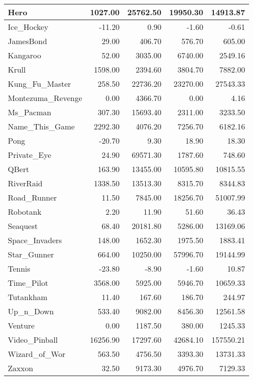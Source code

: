 \begin{table*}[h]
\begin{tabular}{l|r|r|r|r}
		\hline
		Hero & 1027.00 & 25762.50 & 19950.30 & 14913.87 \\
		\hline
		Ice\_Hockey & -11.20 & 0.90 & -1.60 & -0.61 \\
		\hline
		JamesBond & 29.00 & 406.70 & 576.70 & 605.00 \\
		\hline
		Kangaroo & 52.00 & 3035.00 & 6740.00 & 2549.16 \\
		\hline
		Krull & 1598.00 & 2394.60 & 3804.70 & 7882.00 \\
		\hline
		Kung\_Fu\_Master & 258.50 & 22736.20 & 23270.00 & 27543.33 \\
		\hline
		Montezuma\_Revenge & 0.00 & 4366.70 & 0.00 & 4.16 \\
		\hline
		Ms\_Pacman & 307.30 & 15693.40 & 2311.00 & 3233.50 \\
		\hline
		Name\_This\_Game & 2292.30 & 4076.20 & 7256.70 & 6182.16 \\
		\hline
		Pong & -20.70 & 9.30 & 18.90 & 18.30 \\
		\hline
		Private\_Eye & 24.90 & 69571.30 & 1787.60 & 748.60 \\
		\hline
		QBert & 163.90 & 13455.00 & 10595.80 & 10815.55 \\
		\hline
		RiverRaid & 1338.50 & 13513.30 & 8315.70 & 8344.83 \\
		\hline
		Road\_Runner & 11.50 & 7845.00 & 18256.70 & 51007.99 \\
		\hline
		Robotank & 2.20 & 11.90 & 51.60 & 36.43 \\
		\hline
		Seaquest & 68.40 & 20181.80 & 5286.00 & 13169.06 \\
		\hline
		Space\_Invaders & 148.00 & 1652.30 & 1975.50 & 1883.41 \\
		\hline
		Star\_Gunner & 664.00 & 10250.00 & 57996.70 & 19144.99 \\
		\hline
		Tennis & -23.80 & -8.90 & -1.60 & 10.87 \\
		\hline
		Time\_Pilot & 3568.00 & 5925.00 & 5946.70 & 10659.33 \\
		\hline
		Tutankham & 11.40 & 167.60 & 186.70 & 244.97 \\
		\hline
		Up\_n\_Down & 533.40 & 9082.00 & 8456.30 & 12561.58 \\
		\hline
		Venture & 0.00 & 1187.50 & 380.00 & 1245.33 \\
		\hline
		Video\_Pinball & 16256.90 & 17297.60 & 42684.10 & 157550.21 \\
		\hline
		Wizard\_of\_Wor & 563.50 & 4756.50 & 3393.30 & 13731.33 \\
		\hline
		Zaxxon & 32.50 & 9173.30 & 4976.70 & 7129.33 \\
		\hline
	\end{tabular}
\end{table*}

